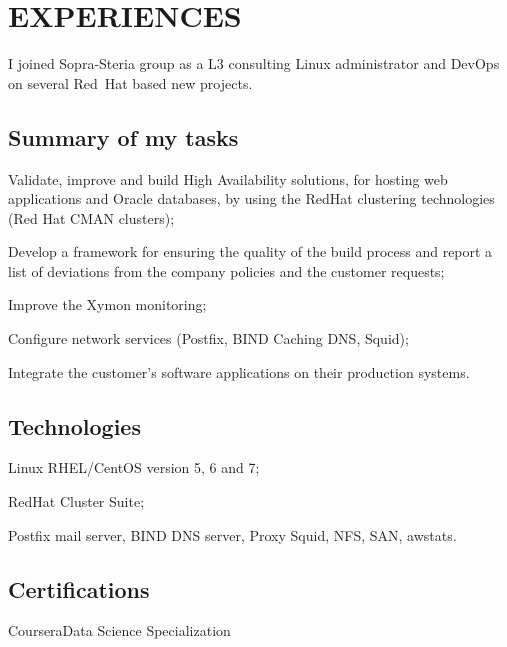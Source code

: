 \section{EXPERIENCES}

I joined Sopra-Steria group as a L3 consulting Linux administrator and DevOps on
several Red~Hat based new projects.

\vskip -2mm
\subsection{Summary of my tasks}

\item{\bdot} Validate, improve and build High Availability solutions,
   for hosting web applications and Oracle databases, by using the RedHat clustering 
   technologies (Red Hat CMAN clusters);
\item{\bdot} Develop a framework for ensuring the quality of the build process
   and report a list of deviations from the company policies and the customer requests;
\item{\bdot} Improve the Xymon monitoring;
\item{\bdot}  Configure network services (Postfix, BIND Caching DNS, Squid);
\item{\bdot}  Integrate the customer's software applications on their production systems.

\vskip -2mm
\subsection{Technologies}

\item{\bdot} Linux RHEL/CentOS version 5, 6 and 7;
\item{\bdot} RedHat Cluster Suite;
\item{\bdot} Postfix mail server, BIND DNS server, Proxy Squid, NFS, SAN, awstats.

\subsection{Certifications}

   {Coursera}{Data Science Specialization}

